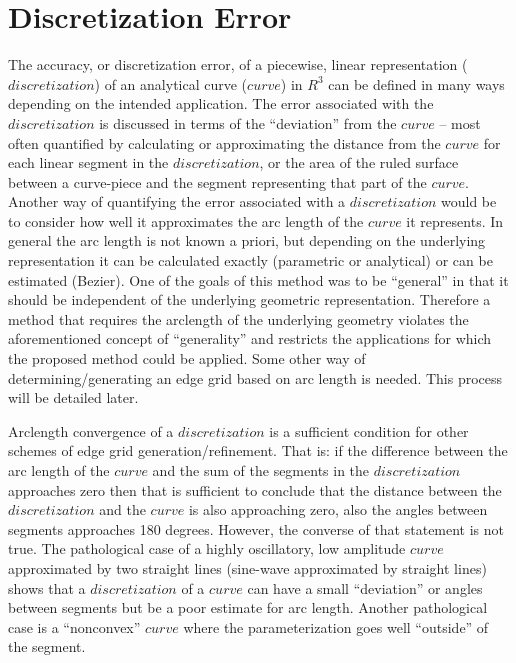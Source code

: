 \section{Discretization Error}
The accuracy, or discretization error, of a piecewise, linear 
representation ($discretization$) of an analytical curve ($curve$) in 
$R^3$ can be defined in many ways depending on the intended application.  
The error associated with the $discretization$ is discussed in terms of 
the ``deviation'' from the $curve$ -- most often quantified by calculating 
or approximating the distance from the $curve$ for each linear segment in 
the $discretization$, or the area of the ruled surface between a 
curve-piece and the segment representing that part of the $curve$.  
Another way of quantifying the error associated with a $discretization$ 
would be to consider how well it approximates the arc length of the 
$curve$ it represents.  In general the arc length is not known a priori, 
but depending on the underlying representation it can be calculated 
exactly (parametric or analytical) or can be estimated (Bezier).  One of 
the goals of this method was to be ``general'' in that it should be 
independent of the underlying geometric representation.  Therefore a 
method that requires the arclength of the underlying geometry violates the 
aforementioned concept of ``generality'' and restricts the applications 
for which the proposed method could be applied.  Some other way of 
determining/generating an edge grid based on arc length is needed.  This 
process will be detailed later.

Arclength convergence of a $discretization$ is a sufficient condition for 
other schemes of edge grid generation/refinement.  That is: if the 
difference between the arc length of the $curve$ and the sum of the 
segments in the $discretization$ approaches zero then that is sufficient 
to conclude that the distance between the $discretization$ and the $curve$ 
is also approaching zero, also the angles between segments approaches 180 
degrees.  However, the converse of that statement is not true.  The 
pathological case of a highly oscillatory, low amplitude $curve$ 
approximated by two straight lines (sine-wave approximated by straight 
lines) shows that a $discretization$ of a $curve$ can have a small 
``deviation'' or angles between segments but be a poor estimate for arc 
length.  Another pathological case is a ``nonconvex'' $curve$ where the 
parameterization goes well ``outside'' of the segment.
